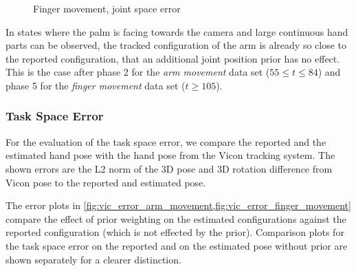 \begin{figure}[h]
\centering
{}
\caption{Finger movement, joint space error}
\label{fig:fm_joint_error}
\end{figure}

In states where the palm is facing towards the camera and large continuous hand parts can be observed, the tracked configuration of the arm is already so close to the reported configuration, that an additional joint position prior has no effect. This is the case after phase 2 for the \textit{arm movement} data set ($55\leq t \leq84$) and phase 5 for the \textit{finger movement} data set ($t \geq 105$).


\subsubsection{Task Space Error}

For the evaluation of the task space error, we compare the reported and the estimated hand pose with the hand pose from the Vicon tracking system. The shown errors are the L2 norm of the 3D pose and 3D rotation difference from Vicon pose to the reported and estimated pose.

The error plots in \cref{fig:vic_error_arm_movement,fig:vic_error_finger_movement} compare the effect of prior weighting on the estimated configurations against the reported configuration (which is not effected by the prior). Comparison plots for the task space error on the reported and on the estimated pose without prior are shown separately for a clearer distinction.

